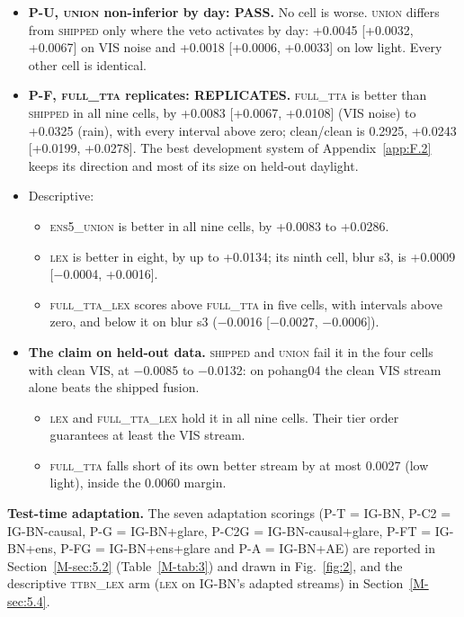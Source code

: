 \documentclass[journal,onecolumn]{IEEEtran}
\begin{document}
\begin{itemize}
\item \textbf{P-U, \textsc{union} non-inferior by day: PASS.} No cell is worse. \textsc{union} differs from \textsc{shipped} only where the veto activates by day: +0.0045 [+0.0032, +0.0067] on VIS noise and +0.0018 [+0.0006, +0.0033] on low light. Every other cell is identical.
\item \textbf{P-F, \textsc{full\_tta} replicates: REPLICATES.} \textsc{full\_tta} is better than \textsc{shipped} in all nine cells, by +0.0083 [+0.0067, +0.0108] (VIS noise) to +0.0325 (rain), with every interval above zero; clean/clean is 0.2925, +0.0243 [+0.0199, +0.0278]. The best development system of Appendix~\ref{app:F.2} keeps its direction and most of its size on held-out daylight.
\item Descriptive:
\begin{itemize}
\item \textsc{ens5\_union} is better in all nine cells, by +0.0083 to +0.0286.
\item \textsc{lex} is better in eight, by up to +0.0134; its ninth cell, blur s3, is +0.0009 [$-$0.0004, +0.0016].
\item \textsc{full\_tta\_lex} scores above \textsc{full\_tta} in five cells, with intervals above zero, and below it on blur s3 ($-$0.0016 [$-$0.0027, $-$0.0006]).
\end{itemize}
\item \textbf{The claim on held-out data.} \textsc{shipped} and \textsc{union} fail it in the four cells with clean VIS, at $-$0.0085 to $-$0.0132: on pohang04 the clean VIS stream alone beats the shipped fusion.
\begin{itemize}
\item \textsc{lex} and \textsc{full\_tta\_lex} hold it in all nine cells. Their tier order guarantees at least the VIS stream.
\item \textsc{full\_tta} falls short of its own better stream by at most 0.0027 (low light), inside the 0.0060 margin.
\end{itemize}
\end{itemize}

\textbf{Test-time adaptation.} The seven adaptation scorings (P-T = \mbox{IG-BN}, P-C2 = \mbox{IG-BN-causal}, P-G = \mbox{IG-BN+glare}, P-C2G = \mbox{IG-BN-causal+glare}, P-FT = \mbox{IG-BN+ens}, P-FG = \mbox{IG-BN+ens+glare} and P-A = \mbox{IG-BN+AE}) are reported in Section~\ref{M-sec:5.2} (Table~\ref{M-tab:3}) and drawn in Fig.~\ref{fig:2}, and the descriptive \textsc{ttbn\_lex} arm (\textsc{lex} on \mbox{IG-BN}'s adapted streams) in Section~\ref{M-sec:5.4}.
\end{document}
